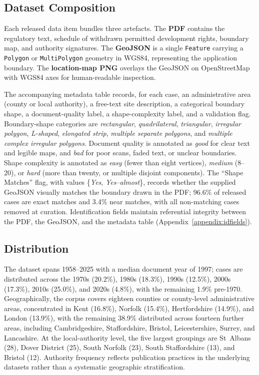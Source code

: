 \documentclass[11pt]{article}
\begin{document}
\subsection{Dataset Composition}
 Each released data item bundles three artefacts. The \textbf{PDF} contains the regulatory text, schedule of withdrawn permitted development rights, boundary map, and authority signatures. The \textbf{GeoJSON} is a single \texttt{Feature} carrying a \texttt{Polygon} or \texttt{MultiPolygon} geometry in WGS84, representing the application boundary. The \textbf{location-map PNG} overlays the GeoJSON on OpenStreetMap with WGS84 axes for human-readable inspection.
 
The accompanying metadata table records, for each case, an administrative area (county or local authority), a free-text site description, a categorical boundary shape, a document-quality label, a shape-complexity label, and a validation flag. Boundary-shape categories are \emph{rectangular}, \emph{quadrilateral}, \emph{triangular}, \emph{irregular polygon}, \emph{L-shaped}, \emph{elongated strip}, \emph{multiple separate polygons}, and \emph{multiple complex irregular polygons}. Document quality is annotated as \emph{good} for clear text and legible maps, and \emph{bad} for poor scans, faded text, or unclear boundaries. Shape complexity is annotated as \emph{easy} (fewer than eight vertices), \emph{medium} (8--20), or \emph{hard} (more than twenty, or multiple disjoint components). The ``Shape Matches'' flag, with values \{\emph{Yes}, \emph{Yes--almost}\}, records whether the supplied GeoJSON visually matches the boundary drawn in the PDF; 96.6\% of released cases are exact matches and 3.4\% near matches, with all non-matching cases removed at curation. Identification fields maintain referential integrity between the PDF, the GeoJSON, and the metadata table (Appendix~\ref{appendix:idfields}).


\subsection{Distribution}
 
The dataset spans 1958--2025 with a median document year of 1997; cases are distributed across the 1970s (20.2\%), 1980s (18.3\%), 1990s (12.5\%), 2000s (17.3\%), 2010s (25.0\%), and 2020s (4.8\%), with the remaining 1.9\% pre-1970. Geographically, the corpus covers eighteen counties or county-level administrative areas, concentrated in Kent (16.8\%), Norfolk (15.4\%), Hertfordshire (14.9\%), and London (13.9\%), with the remaining 38.9\% distributed across fourteen further areas, including Cambridgeshire, Staffordshire, Bristol, Leicestershire, Surrey, and Lancashire. At the local-authority level, the five largest groupings are St~Albans (28), Dover District (25), South Norfolk (23), South Staffordshire (13), and Bristol (12). Authority frequency reflects publication practices in the underlying datasets rather than a systematic geographic stratification.
 
\end{document}
